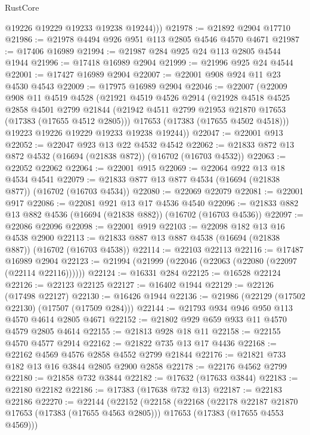 \begin{lexlean}{RustCore}
\begin{coremodule}
          @19226
          @19229
          @19233
          @19238
          @19244)))
@21978 := @21892 @2904 @17710
@21986 := @21978 @4494 @926 @951 @113 @2805 @4546 @4570 @4671
@21987 := @17406 @16989
@21994 := @21987 @284 @925 @24 @113 @2805 @4544 @1944
@21996 := @17418 @16989 @2904
@21999 := @21996 @925 @24 @4544
@22001 := @17427 @16989 @2904
@22007 := @22001 @908 @924 @11 @23 @4530 @4543
@22009 := @17975 @16989 @2904
@22046 := @22007
    (@22009
      @908
      @11
      @4519
      @4528
      (@21921
        @4519
        @4526
        @2914
        (@21928
          @4518
          @4525
          @2858
          @4501
          @2799
          @21844
          (@21942 @4511 @2799 @21953 @21870 @17653 (@17383 (@17655 @4512 @2805)))
          @17653
          (@17383 (@17655 @4502 @4518)))
        @19223
        @19226
        @19229
        @19233
        @19238
        @19244))
@22047 := @22001 @913
@22052 := @22047 @923 @13 @22 @4532 @4542
@22062 := @21833 @872 @13 @872 @4532 (@16694 (@21838 @872)) (@16702 (@16703 @4532))
@22063 := @22052 @22062
@22064 := @22001 @915
@22069 := @22064 @922 @13 @18 @4534 @4541
@22079 := @21833 @877 @13 @877 @4534 (@16694 (@21838 @877)) (@16702 (@16703 @4534))
@22080 := @22069 @22079
@22081 := @22001 @917
@22086 := @22081 @921 @13 @17 @4536 @4540
@22096 := @21833 @882 @13 @882 @4536 (@16694 (@21838 @882)) (@16702 (@16703 @4536))
@22097 := @22086 @22096
@22098 := @22001 @919
@22103 := @22098 @182 @13 @16 @4538 @2900
@22113 := @21833 @887 @13 @887 @4538 (@16694 (@21838 @887)) (@16702 (@16703 @4538))
@22114 := @22103 @22113
@22116 := @17487 @16989 @2904
@22123 := @21994 (@21999 (@22046 (@22063 (@22080 (@22097 (@22114 @22116))))))
@22124 := @16331 @284
@22125 := @16528 @22124
@22126 := @22123 @22125
@22127 := @16402 @1944
@22129 := @22126 (@17498 @22127)
@22130 := @16426 @1944
@22136 := @21986 (@22129 (@17502 @22130) (@17507 (@17509 @284)))
@22144 := @21793 @934 @946 @950 @113 @4570 @4614 @2805 @4671
@22152 := @21802 @929 @659 @933 @11 @4570 @4579 @2805 @4614
@22155 := @21813 @928 @18 @11
@22158 := @22155 @4570 @4577 @2914
@22162 := @21822 @735 @13 @17 @4436
@22168 := @22162 @4569 @4576 @2858 @4552 @2799 @21844
@22176 := @21821 @733 @182 @13 @16 @3844 @2805 @2900 @2858
@22178 := @22176 @4562 @2799
@22180 := @21858 @732 @3844
@22182 := @17632 (@17633 @3844)
@22183 := @22180 @22182
@22186 := @17383 (@17638 @732 @13)
@22187 := @22183 @22186
@22270 := @22144
    (@22152
      (@22158
        (@22168
          (@22178 @22187 @21870 @17653 (@17383 (@17655 @4563 @2805)))
          @17653
          (@17383 (@17655 @4553 @4569)))

\end{coremodule}
\end{lexlean}
